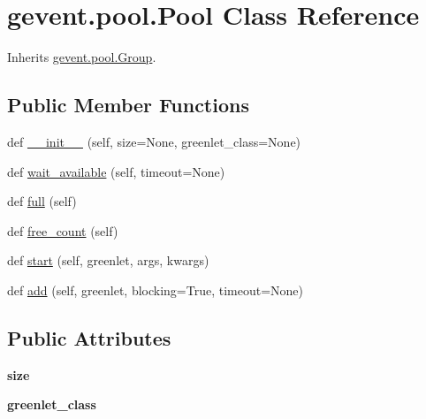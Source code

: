 \hypertarget{classgevent_1_1pool_1_1_pool}{}\section{gevent.\+pool.\+Pool Class Reference}
\label{classgevent_1_1pool_1_1_pool}


Inherits \hyperlink{classgevent_1_1pool_1_1_group}{gevent.\+pool.\+Group}.

\subsection*{Public Member Functions}
\begin{DoxyCompactItemize}
\item 
def \hyperlink{classgevent_1_1pool_1_1_pool_ab8f7535704e4be9d689c2f8cb8908363}{\+\_\+\+\_\+init\+\_\+\+\_\+} (self, size=None, greenlet\+\_\+class=None)
\item 
def \hyperlink{classgevent_1_1pool_1_1_pool_a3bb9b19f625d5a050491655c713dc785}{wait\+\_\+available} (self, timeout=None)
\item 
def \hyperlink{classgevent_1_1pool_1_1_pool_a1e557c08dca29d3aefa26737b8aa83e3}{full} (self)
\item 
def \hyperlink{classgevent_1_1pool_1_1_pool_a9da095e3393c66005b1db28402e377a5}{free\+\_\+count} (self)
\item 
def \hyperlink{classgevent_1_1pool_1_1_pool_a796a9ecd340aa63e7adbfbbf64aa811d}{start} (self, greenlet, args, kwargs)
\item 
def \hyperlink{classgevent_1_1pool_1_1_pool_a2037069f5c0d51a2b0ad368c888a7055}{add} (self, greenlet, blocking=True, timeout=None)
\end{DoxyCompactItemize}
\subsection*{Public Attributes}
\begin{DoxyCompactItemize}
\item 
\mbox{\label{classgevent_1_1pool_1_1_pool_ab6ce868bedbb5fd112f52f02b0b26b06}} 
{\bfseries size}
\item 
\mbox{\label{classgevent_1_1pool_1_1_pool_a0f195611e30fe17a4948d6efd428e353}} 
{\bfseries greenlet\+\_\+class}
\end{DoxyCompactItemize}
